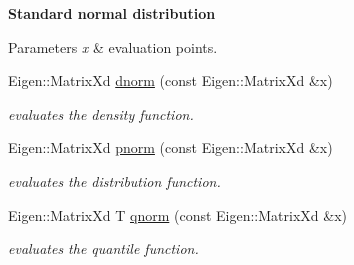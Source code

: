 \begin{Indent}{\bf Standard normal distribution}\par
{\em 
\begin{DoxyParams}{Parameters}
{\em x} & evaluation points. \\
\hline
\end{DoxyParams}
}\begin{DoxyCompactItemize}
\item 
Eigen\+::\+Matrix\+Xd \hyperlink{namespacetools__stats_a6cccc042aa52752b71bc26aa75eb5e96}{dnorm} (const Eigen\+::\+Matrix\+Xd \&x)\hypertarget{namespacetools__stats_a6cccc042aa52752b71bc26aa75eb5e96}{}\label{namespacetools__stats_a6cccc042aa52752b71bc26aa75eb5e96}

\begin{DoxyCompactList}\small\item\em evaluates the density function. \end{DoxyCompactList}\item 
Eigen\+::\+Matrix\+Xd \hyperlink{namespacetools__stats_af3b2c7c267f78fbc8c3de26ef959a58f}{pnorm} (const Eigen\+::\+Matrix\+Xd \&x)\hypertarget{namespacetools__stats_af3b2c7c267f78fbc8c3de26ef959a58f}{}\label{namespacetools__stats_af3b2c7c267f78fbc8c3de26ef959a58f}

\begin{DoxyCompactList}\small\item\em evaluates the distribution function. \end{DoxyCompactList}\item 
Eigen\+::\+Matrix\+Xd T \hyperlink{namespacetools__stats_a1d771ac8853f0645315ce40c962a93a4}{qnorm} (const Eigen\+::\+Matrix\+Xd \&x)\hypertarget{namespacetools__stats_a1d771ac8853f0645315ce40c962a93a4}{}\label{namespacetools__stats_a1d771ac8853f0645315ce40c962a93a4}

\begin{DoxyCompactList}\small\item\em evaluates the quantile function. \end{DoxyCompactList}\end{DoxyCompactItemize}
\end{Indent}
